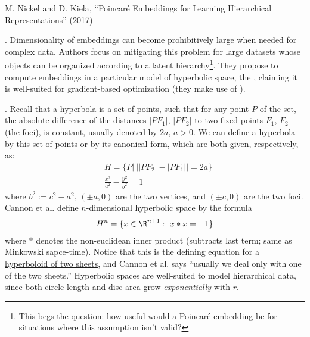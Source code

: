 \documentclass[11pt]{article}
\newcommand\myspace[1][]{\vspace{#1\bigskipamount}}
\newcommand\p{\Needspace{10\baselineskip} \noindent}
\begin{document}
\vspace{-1em}
{\footnotesize M. Nickel and D. Kiela, ``Poincar\'{e} Embeddings for Learning Hierarchical Representations'' (2017)}


\p {}. Dimensionality of embeddings can become prohibitively large when needed for complex data. Authors focus on mitigating this problem for large datasets whose objects can be organized according to a latent hierarchy\footnote{This begs the question: how useful would a Poincar\'{e} embedding be for situations where this assumption isn't valid?}. They propose to compute embeddings in a particular model of hyperbolic space, the , claiming it is well-suited for gradient-based optimization (they make use of ).

\myspace
\p {}. Recall that a hyperbola is a set of points, such that for any point $P$ of the set, the absolute difference of the distances $|PF_1|$, $|PF_2|$ to two fixed points $F_1$, $F_2$ (the foci), is constant, usually denoted by $2a$, $a > 0$. We can define a hyperbola by this set of points or by its canonical form, which are both given, respectively, as:
\begin{align}
	&H = \{ P | ~ | |PF_2| - |PF_1| | = 2a \} \\
	&\frac{x^2}{a^2} - \frac{y^2}{b^2} = 1
\end{align}
where $b^2 := c^2 - a^2$, $(\pm a, 0)$ are the two vertices, and $(\pm c, 0)$ are the two foci. Cannon et al. define $n$-dimensional hyperbolic space by the formula
\begin{align}
	H^n = \{x   \in \R^{n+1} : ~ x * x = -1   \}
\end{align}
where $*$ denotes the non-euclidean inner product (subtracts last term; same as Minkowski sapce-time). Notice that this is the defining equation for a  \href{http://mathworld.wolfram.com/Two-SheetedHyperboloid.html}{hyperboloid of two sheets}, and Cannon et al. says ``usually we deal only with one of the two sheets.'' Hyperbolic spaces are well-suited to model hierarchical data, since both circle length and disc area grow \textit{exponentially} with $r$.
\end{document}
